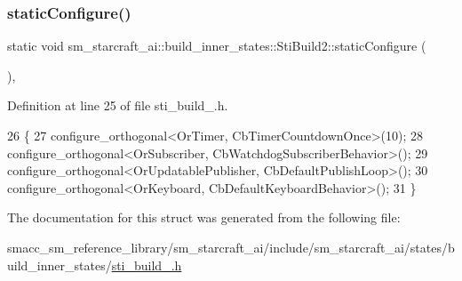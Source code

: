 \subsubsection{\texorpdfstring{static\+Configure()}{staticConfigure()}}
{\footnotesize\ttfamily static void sm\+\_\+starcraft\+\_\+ai\+::build\+\_\+inner\+\_\+states\+::\+Sti\+Build2\+::static\+Configure (\begin{DoxyParamCaption}{ }\end{DoxyParamCaption})\hspace{0.3cm}{\ttfamily [inline]}, {\ttfamily [static]}}



Definition at line 25 of file sti\+\_\+build\+\_.\+h.


\begin{DoxyCode}
26   \{
27     configure\_orthogonal<OrTimer, CbTimerCountdownOnce>(10);
28     configure\_orthogonal<OrSubscriber, CbWatchdogSubscriberBehavior>();
29     configure\_orthogonal<OrUpdatablePublisher, CbDefaultPublishLoop>();
30     configure\_orthogonal<OrKeyboard, CbDefaultKeyboardBehavior>();
31   \}
\end{DoxyCode}


The documentation for this struct was generated from the following file\+:\begin{DoxyCompactItemize}
\item 
smacc\+\_\+sm\+\_\+reference\+\_\+library/sm\+\_\+starcraft\+\_\+ai/include/sm\+\_\+starcraft\+\_\+ai/states/build\+\_\+inner\+\_\+states/\hyperlink{sti__build__2_8h}{sti\+\_\+build\+\_.\+h}\end{DoxyCompactItemize}
